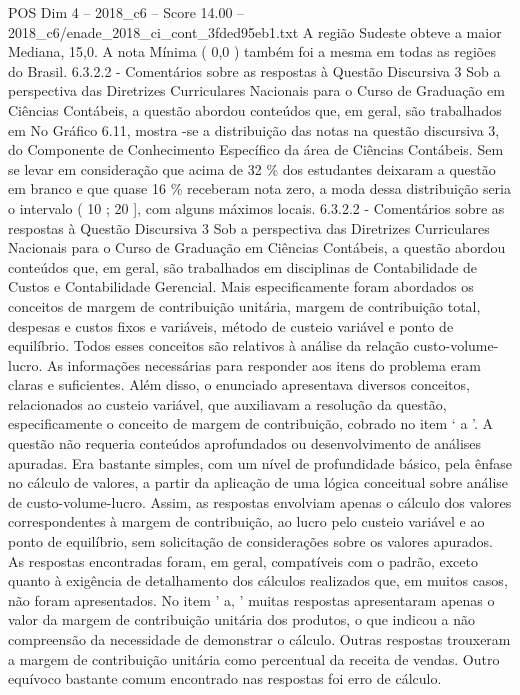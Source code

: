 \begin{textsample}{POS Dim 4 – 2018\_c6 – Score 14.00 – 2018\_c6/enade\_2018\_ci\_cont\_3fded95eb1.txt}
A região Sudeste obteve a maior Mediana, 15,0.
A nota Mínima ( 0,0 ) também foi a mesma em todas as regiões do Brasil. 6.3.2.2 - Comentários sobre as respostas à Questão Discursiva 3 Sob a perspectiva das Diretrizes Curriculares Nacionais para o Curso de Graduação em Ciências Contábeis, a questão abordou conteúdos que, em geral, são trabalhados em No Gráfico 6.11, mostra -se a distribuição das notas na questão discursiva 3, do Componente de Conhecimento Específico da área de Ciências Contábeis.
Sem se levar em consideração que acima de 32 \% dos estudantes deixaram a questão em branco e que quase 16 \% receberam nota zero, a moda dessa distribuição seria o intervalo ( 10 ; 20 ], com alguns máximos locais. 6.3.2.2 - Comentários sobre as respostas à Questão Discursiva 3 Sob a perspectiva das Diretrizes Curriculares Nacionais para o Curso de Graduação em Ciências Contábeis, a questão abordou conteúdos que, em geral, são trabalhados em disciplinas de Contabilidade de Custos e Contabilidade Gerencial.
Mais especificamente foram abordados os conceitos de margem de contribuição unitária, margem de contribuição total, despesas e custos fixos e variáveis, método de custeio variável e ponto de equilíbrio.
Todos esses conceitos são relativos à análise da relação custo-volume-lucro.
As informações necessárias para responder aos itens do problema eram claras e suficientes.
Além disso, o enunciado apresentava diversos conceitos, relacionados ao custeio variável, que auxiliavam a resolução da questão, especificamente o conceito de margem de contribuição, cobrado no item ‘ a ’.
A questão não requeria conteúdos aprofundados ou desenvolvimento de análises apuradas.
Era bastante simples, com um nível de profundidade básico, pela ênfase no cálculo de valores, a partir da aplicação de uma lógica conceitual sobre análise de custo-volume-lucro.
Assim, as respostas envolviam apenas o cálculo dos valores correspondentes à margem de contribuição, ao lucro pelo custeio variável e ao ponto de equilíbrio, sem solicitação de considerações sobre os valores apurados.
As respostas encontradas foram, em geral, compatíveis com o padrão, exceto quanto à exigência de detalhamento dos cálculos realizados que, em muitos casos, não foram apresentados.
No item ' a, ' muitas respostas apresentaram apenas o valor da margem de contribuição unitária dos produtos, o que indicou a não compreensão da necessidade de demonstrar o cálculo.
Outras respostas trouxeram a margem de contribuição unitária como percentual da receita de vendas.
Outro equívoco bastante comum encontrado nas respostas foi erro de cálculo.

\end{textsample}
